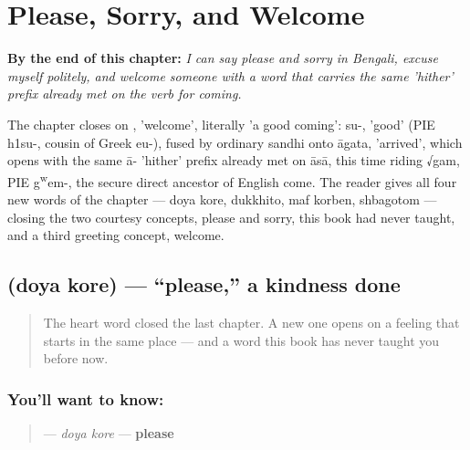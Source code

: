 
\chapter{Please, Sorry, and Welcome}
\label{ch:bn-please-sorry-welcome}

\begin{chapteropening}
\textbf{By the end of this chapter:} \emph{I can say please and sorry in Bengali, excuse myself politely, and welcome someone with a word that carries the same 'hither' prefix already met on the verb for coming.}

The chapter closes on , 'welcome', literally 'a good coming': su-, 'good' (PIE h1su-, cousin of Greek eu-), fused by ordinary sandhi onto āgata, 'arrived', which opens with the same ā- 'hither' prefix already met on āsā, this time riding √gam, PIE g\textsuperscript{w}em-, the secure direct ancestor of English come. The reader gives all four new words of the chapter — doya kore, dukkhito, maf korben, shbagotom — closing the two courtesy concepts, please and sorry, this book had never taught, and a third greeting concept, welcome.
\end{chapteropening}

\section[\texorpdfstring{\bn{দয়া} \bn{করে} (doya kore)}{দয়া করে (doya kore)}]{  (doya kore) — \textquotedblleft{}please,\textquotedblright{} a kindness done}

\label{lesson:BN-C13-doya-kore}



\begin{quote}
The heart word closed the last chapter. A new one opens on a feeling that starts in the same place — and a word this book has never taught you before now.
\end{quote}

\subsection*{You'll want to know:  }
\begin{quote}
\textbf{ } — \emph{doya kore} — \textbf{please}
\end{quote}

